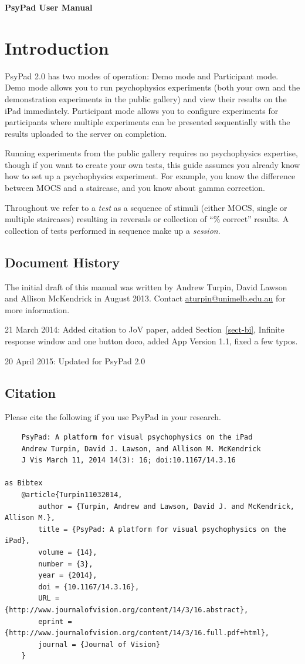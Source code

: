 \documentclass{article}
\begin{document}
{\Large\centering\bf PsyPad User Manual}

\section*{Introduction}

PsyPad 2.0 has two modes of operation: Demo mode and Participant mode.
Demo mode allows you to run psychophysics experiments (both your own
and the demonstration experiments in the public gallery) and view their
results on the iPad immediately.
Participant mode allows you to configure experiments for participants
where multiple experiments can be presented sequentially with the
results uploaded to the server on completion.

Running experiments from the public gallery requires no psychophysics expertise, though if you want to create your own tests, this guide assumes you already know how to set up a psychophysics experiment. For example, you know the difference between MOCS and a staircase, and you know about gamma correction.

Throughout we refer to a \emph{test} as a sequence of stimuli (either MOCS, single or multiple staircases) resulting in reversals or 
collection of ``\% correct'' results. 
A collection of tests performed in sequence make up a \emph{session}.

\subsection*{Document History}
The initial draft of this manual was written by
Andrew Turpin, David Lawson and Allison McKendrick in August 2013.
Contact \url{aturpin@unimelb.edu.au} for more information.

21 March 2014: Added citation to JoV paper, added Section~\ref{sect-bi}, Infinite response window 
and one button doco, added App Version 1.1, fixed a few typos.

20 April 2015: Updated for PsyPad 2.0

\subsection*{Citation}

Please cite the following if you use PsyPad in your research.
\begin{verbatim}
    PsyPad: A platform for visual psychophysics on the iPad
    Andrew Turpin, David J. Lawson, and Allison M. McKendrick
    J Vis March 11, 2014 14(3): 16; doi:10.1167/14.3.16

as Bibtex
    @article{Turpin11032014,
        author = {Turpin, Andrew and Lawson, David J. and McKendrick, Allison M.}, 
        title = {PsyPad: A platform for visual psychophysics on the iPad},
        volume = {14}, 
        number = {3}, 
        year = {2014}, 
        doi = {10.1167/14.3.16}, 
        URL = {http://www.journalofvision.org/content/14/3/16.abstract}, 
        eprint = {http://www.journalofvision.org/content/14/3/16.full.pdf+html}, 
        journal = {Journal of Vision} 
    }
\end{verbatim}
\end{document}
